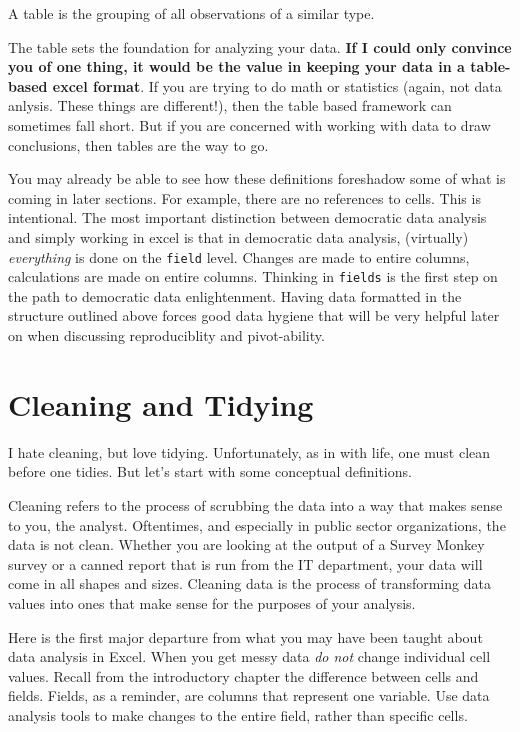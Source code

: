 \documentclass[]{book}
\begin{document}
A table is the grouping of all observations of a similar type.

The table sets the foundation for analyzing your data. \textbf{If I could only convince you of one thing, it would be the value in keeping your data in a table-based excel format}. If you are trying to do math or statistics (again, not data anlysis. These things are different!), then the table based framework can sometimes fall short. But if you are concerned with working with data to draw conclusions, then tables are the way to go.

You may already be able to see how these definitions foreshadow some of what is coming in later sections. For example, there are no references to cells. This is intentional. The most important distinction between democratic data analysis and simply working in excel is that in democratic data analysis, (virtually) \emph{everything} is done on the \texttt{field} level. Changes are made to entire columns, calculations are made on entire columns. Thinking in \texttt{fields} is the first step on the path to democratic data enlightenment. Having data formatted in the structure outlined above forces good data hygiene that will be very helpful later on when discussing reproduciblity and pivot-ability.

\hypertarget{cleaning-and-tidying}{%
\section{Cleaning and Tidying}\label{cleaning-and-tidying}}

I hate cleaning, but love tidying. Unfortunately, as in with life, one must clean before one tidies. But let's start with some conceptual definitions.

Cleaning refers to the process of scrubbing the data into a way that makes sense to you, the analyst. Oftentimes, and especially in public sector organizations, the data is not clean. Whether you are looking at the output of a Survey Monkey survey or a canned report that is run from the IT department, your data will come in all shapes and sizes. Cleaning data is the process of transforming data values into ones that make sense for the purposes of your analysis.

Here is the first major departure from what you may have been taught about data analysis in Excel. When you get messy data \emph{do not} change individual cell values. Recall from the introductory chapter the difference between cells and fields. Fields, as a reminder, are columns that represent one variable. Use data analysis tools to make changes to the entire field, rather than specific cells.
\end{document}
